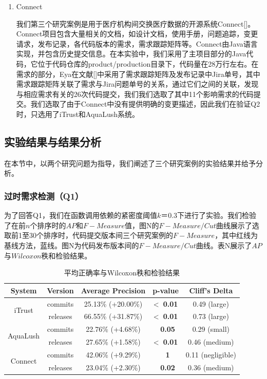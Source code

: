 \begin{enumerate}
\begin{table}[]
\begin{tabular}{@{}lll@{}}
\end{tabular}
\end{table}

  \item Connect

  我们第三个研究案例是用于医疗机构间交换医疗数据的开源系统Connect[]。Connect项目包含大量相关的文档，如设计文档，使用手册，问题追踪，变更请求，发布记录，各代码版本的需求，需求跟踪矩阵等。Connect由Java语言实现，并包含历史提交信息。在本实验中，我们采用了主项目部分的Java代码，它位于代码仓库的product/production目录下，代码量在28万行左右。在需求的部分，Eya在文献[]中采用了需求跟踪矩阵及发布记录中Jira单号，其中需求跟踪矩阵关联了需求与Jira问题单号的关系，通过它们之间的关联，发现与相应需求有关的26次代码提交，我们我们选取了其中11个影响需求的代码提交。我们选取了由于Connect中没有提供明确的变更描述，因此我们在验证Q2时，只选用了iTrust和AquaLush系统。
\end{enumerate}

\subsection{实验结果与结果分析}

在本节中，以两个研究问题为指导，我们阐述了三个研究案例的实验结果并给予分析。

\subsubsection{过时需求检测（Q1）}
为了回答Q1，我们在函数调用依赖的紧密度阈值$k＝0.3$下进行了实验。我们检验了在前$n$个排序时的$AP$和$F-Measure$值，图N的$F-Measure/Cut$曲线展示了选取前1至30个排序时，代码提交版本间三个研究案例的$F-Measure$，其中红线为基线方法，蓝线。图N为代码发布版本间的$F-Measure/Cut$曲线。表N展示了$AP$与$Wilcoxon$秩和检验结果。

\begin{table}[]
\centering
\caption{平均正确率与Wilcoxon秩和检验结果}
\label{my-label}
\begin{tabular}{@{}ccccc@{}}
\toprule
System                    & Version  & Average Precision & p-value        & Cliff’s Delta     \\ \midrule
\multirow{2}{*}{iTrust}   & commits  & 25.13\% (+20.00\%) & \textless \textbf{\ 0.01} & 0.49 (large)      \\
                          & releases & 66.55\% (+31.87\%) & \textless \textbf{\ 0.01} & 0.73 (large)      \\
\multirow{2}{*}{AquaLush} & commits  & 22.76\% (+4.68\%) & \textbf{\ 0.05}           & 0.29 (small)      \\
                          & releases & 27.65\% (+1.58\%) & \textless \textbf{\ 0.01} & 0.46 (medium)     \\
\multirow{2}{*}{Connect}  & commits  & 42.06\% (+9.29\%) & \textbf{\ 1}              & 0.11 (negligible) \\
                          & releases & 23.04\% (+2.30\%) & \textbf{\ 0.02}           & 0.36 (medium)     \\ \cmidrule(l){1-5} 
\end{tabular}
\end{table}


